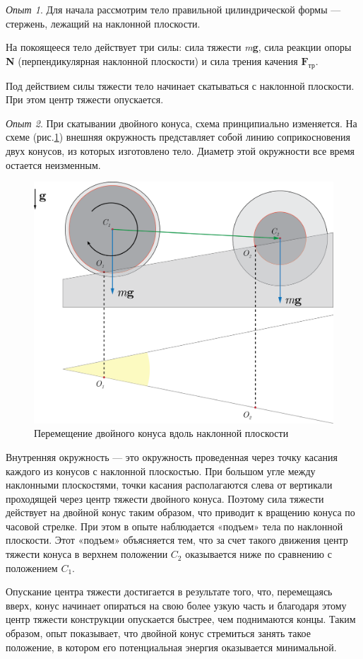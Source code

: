 \documentclass[14pt,a4paper,oneside]{extarticle}	%
\begin{document}
	\textit{Опыт 1}. Для начала рассмотрим тело правильной цилиндрической формы  — стержень, лежащий на наклонной плоскости.
	
	На покоящееся тело действует три силы: сила тяжести \textit{m}\textbf{g}, сила реакции опоры \textbf{N} (перпендикулярная наклонной плоскости) и сила трения качения $ \textbf{F}_{\text{тр}} $.
	
	Под действием силы тяжести тело начинает скатываться с наклонной плоскости.
	При этом центр тяжести опускается.
	
	\textit{Опыт 2}. При скатывании двойного конуса, схема принципиально изменяется.
	На схеме (рис.\ref{center-4}) внешняя окружность представляет собой линию соприкосновения двух конусов, из которых изготовлено тело.
	Диаметр этой окружности все время остается неизменным.
			\begin{figure}[H] 	
		\centering 	
		\includegraphics[width=0.75\linewidth]{center-4.png}
		\caption{Перемещение двойного конуса вдоль наклонной плоскости}
		\label{center-4}
	\end{figure}

	Внутренняя окружность — это окружность проведенная через точку касания каждого из конусов с наклонной плоскостью.
	 При большом угле между наклонными плоскостями, точки касания располагаются слева от вертикали проходящей через центр тяжести двойного конуса. Поэтому сила тяжести действует на двойной конус таким образом, что приводит к вращению конуса по часовой стрелке. 
	 При этом в опыте наблюдается «подъем» тела по наклонной плоскости.
	 Этот «подъем» объясняется тем, что за счет такого движения центр тяжести конуса в верхнем положении $ C_{2} $ оказывается ниже по сравнению с положением $ C_{1} $.

	Опускание центра тяжести достигается в результате того, что, перемещаясь вверх, конус начинает опираться на свою более узкую часть и благодаря этому центр тяжести конструкции опускается быстрее, чем поднимаются концы.
	Таким образом, опыт показывает, что двойной конус стремиться занять такое положение, в котором его потенциальная энергия оказывается минимальной.
	
\end{document}

